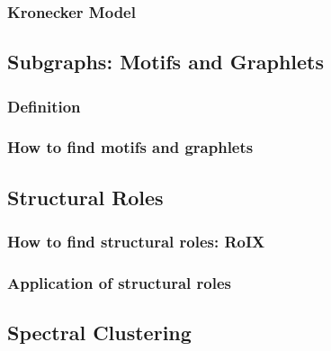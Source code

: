 \subsubsection{Kronecker Model}

\subsection{Subgraphs: Motifs and Graphlets}

\subsubsection{Definition}

\subsubsection{How to find motifs and graphlets}

\subsection{Structural Roles}

\subsubsection{How to find structural roles: RoIX}

\subsubsection{Application of structural roles}

\subsection{Spectral Clustering}\label{ss_21_spec_clus}